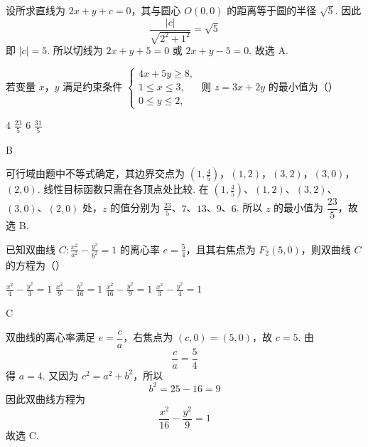 \begin{solution}
设所求直线为 \(2x+y+c=0\)，其与圆心 \(O(0,0)\) 的距离等于圆的半径 \(\sqrt5\). 因此
\[
\frac{|c|}{\sqrt{2^2+1^2}}=\sqrt5
\]
即 \(|c|=5\). 所以切线为 \(2x+y+5=0\) 或 \(2x+y-5=0\).
故选 A.
\end{solution}

\begin{problem}
若变量 \(x\)，\(y\) 满足约束条件 \(\begin{cases}
4x + 5y \geqslant 8,\\
1 \leqslant x \leqslant 3,\\
0 \leqslant y \leqslant 2,
\end{cases}\) 则 \(z = 3x + 2y\) 的最小值为（\quad）

\choices
    {\(4\)}
    {\(\frac{23}{5}\)}
    {\(6\)}
    {\(\frac{31}{5}\)}
\end{problem}

\begin{answer}
B
\end{answer}

\begin{solution}
可行域由题中不等式确定，其边界交点为
\(\left(1,\frac45\right)\)，\((1,2)\)，\((3,2)\)，\((3,0)\)，\((2,0)\).
线性目标函数只需在各顶点处比较. 在 \(\left(1,\frac45\right)\)、\((1,2)\)、\((3,2)\)、\((3,0)\)、\((2,0)\) 处，\(z\) 的值分别为 \(\frac{23}{5}\)、\(7\)、\(13\)、\(9\)、\(6\).
所以 \(z\) 的最小值为 \(\dfrac{23}{5}\)，故选 B.
\end{solution}

\begin{problem}
已知双曲线 \( C: \frac{x^{2}}{a^{2}} - \frac{y^{2}}{b^{2}} = 1 \) 的离心率 \( e = \frac{5}{4} \)，且其右焦点为 \( F_{2}(5,0) \)，则双曲线 \(C\) 的方程为（\quad）

\choices
    {\(\frac{x^2}{4} -\frac{y^2}{3} = 1\)}
    {\(\frac{x^2}{9} -\frac{y^2}{16} = 1\)}
    {\(\frac{x^2}{16} -\frac{y^2}{9} = 1\)}
    {\(\frac{x^2}{3} -\frac{y^2}{4} = 1\)}
\end{problem}

\begin{answer}
C
\end{answer}

\begin{solution}
双曲线的离心率满足 \(e=\dfrac ca\)，右焦点为 \((c,0)=(5,0)\)，故 \(c=5\). 由
\[
\frac ca=\frac54
\]
得 \(a=4\). 又因为 \(c^2=a^2+b^2\)，所以
\[
b^2=25-16=9
\]
因此双曲线方程为
\[
\frac{x^2}{16}-\frac{y^2}{9}=1
\]
故选 C.
\end{solution}

